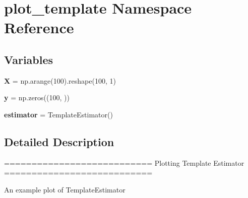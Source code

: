 \hypertarget{namespaceplot__template}{}\section{plot\+\_\+template Namespace Reference}
\label{namespaceplot__template}
\subsection*{Variables}
\begin{DoxyCompactItemize}
\item 
{\bfseries X} = np.\+arange(100).reshape(100, 1)\hypertarget{namespaceplot__template_a1c2f63bd6e9bc6c203dd3d6fca9f7a7c}{}\label{namespaceplot__template_a1c2f63bd6e9bc6c203dd3d6fca9f7a7c}

\item 
{\bfseries y} = np.\+zeros((100, ))\hypertarget{namespaceplot__template_a9863ca5a0b864f8354df4bb824733c1b}{}\label{namespaceplot__template_a9863ca5a0b864f8354df4bb824733c1b}

\item 
{\bfseries estimator} = Template\+Estimator()\hypertarget{namespaceplot__template_af2f3aafbd574f1f32f3cbc489a84cc04}{}\label{namespaceplot__template_af2f3aafbd574f1f32f3cbc489a84cc04}

\end{DoxyCompactItemize}


\subsection{Detailed Description}
\begin{DoxyVerb}===========================
Plotting Template Estimator
===========================

An example plot of TemplateEstimator
\end{DoxyVerb}
 